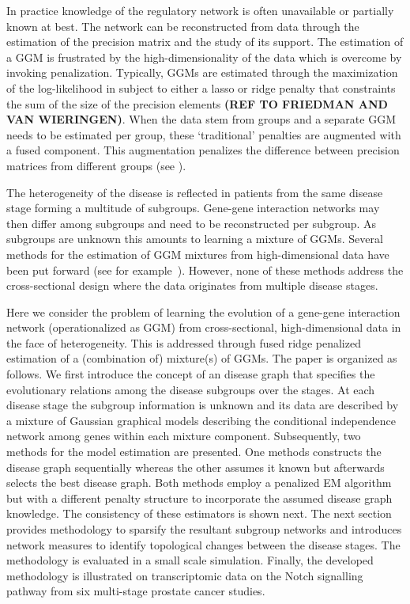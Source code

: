 \documentclass[10pt]{article}
\begin{document}
In practice knowledge of the regulatory network is often unavailable or partially known at best. The network can be reconstructed from data through the estimation of the precision matrix and the study of its support. The estimation of a GGM is frustrated by the high-dimensionality of the data which is overcome by invoking penalization. Typically, GGMs are estimated through the maximization of the log-likelihood in subject to either a lasso or ridge penalty that constraints the sum of the size of the precision elements \textbf{(REF TO FRIEDMAN AND VAN WIERINGEN)}. When the data stem from groups and a separate GGM needs to be estimated per group, these `traditional' penalties are augmented with a fused component. This augmentation penalizes the difference between precision matrices from different groups (see \citet{Bilg2015,danaher2014joint,guo2011joint,zhu2014structural}). 

The heterogeneity of the disease is reflected in patients from the same disease stage forming a multitude of subgroups. Gene-gene interaction networks may then differ among subgroups and need to be reconstructed per subgroup. As subgroups are unknown this amounts to learning a mixture of GGMs. 
Several methods for the estimation of GGM mixtures from high-dimensional data have been put forward 
(see for example~\citet{raftery2006variable,maugis2009,maugis2011non,ruan2011,lotsi2013,hill2013,azizyan2015}). However, none of these methods address the cross-sectional design where the data originates from multiple disease stages.


Here we consider the problem of learning the evolution of a gene-gene interaction network (operationalized as GGM) from cross-sectional, high-dimensional data in the face of heterogeneity. This is addressed through fused ridge penalized estimation of a (combination of) mixture(s) of GGMs. The paper is organized as follows. We first introduce the concept of an disease graph that specifies the evolutionary relations among the disease subgroups over the stages. At each disease stage the subgroup information is unknown and its data are described by a mixture of Gaussian graphical models describing the conditional independence network among genes within each mixture component. Subsequently, two methods for the model estimation are presented. One methods constructs the disease graph sequentially whereas the other assumes it known but afterwards selects the best disease graph. Both methods employ a penalized EM algorithm but with a different penalty structure to incorporate the assumed disease graph knowledge. The consistency of these estimators is shown next. The next section provides methodology to sparsify the resultant subgroup networks and introduces network measures to identify topological changes between the disease stages. The methodology is evaluated in a small scale simulation. Finally, the developed methodology is illustrated on transcriptomic data on the Notch signalling pathway from six multi-stage prostate cancer studies.
\end{document}
